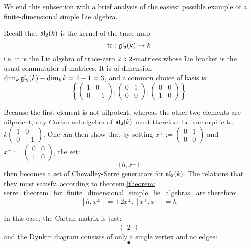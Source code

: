         We end this subsection with a brief analysis of the easiest possible example of a finite-dimensional simple Lie algebra. 
        \begin{example}[$\sl_2$] \label{example: sl_2}
            Recall that $\sl_2(k)$ is the kernel of the trace map:
                $$\trace: \gl_2(k) \to k$$
            i.e. it is the Lie algebra of trace-zero $2 \x 2$-matrices whose Lie bracket is the usual commutator of matrices. It is of dimension $\dim_k \gl_2(k) - \dim_k k = 4 - 1 = 3$, and a common choice of basis is:
                $$\left\{ \begin{pmatrix} 1 & 0 \\ 0 & -1 \end{pmatrix}, \begin{pmatrix} 0 & 1 \\ 0 & 0 \end{pmatrix}, \begin{pmatrix} 0 & 0 \\ 1 & 0 \end{pmatrix} \right\}$$
                
            Because the first element is not nilpotent, whereas the other two elements are nilpotent, any Cartan subalgebra of $\sl_2(k)$ must therefore be isomorphic to $k \begin{pmatrix} 1 & 0 \\ 0 & -1 \end{pmatrix}$. One can then show that by setting $x^+ := \begin{pmatrix} 0 & 1 \\ 0 & 0 \end{pmatrix}$ and $x^- := \begin{pmatrix} 0 & 0 \\ 1 & 0 \end{pmatrix}$, the set:
                $$\{h, x^{\pm}\}$$
            then becomes a set of Chevalley-Serre generators for $\sl_2(k)$. The relations that they must satisfy, according to theorem \ref{theorem: serre_theorem_for_finite_dimensional_simple_lie_algebras}, are therefore:
                $$[h, x^{\pm}] = \pm 2 x^{\pm}, [x^+, x^-] = h$$
            
            In this case, the Cartan matrix is just:
                $$\begin{pmatrix} 2 \end{pmatrix}$$
            and the Dynkin diagram consists of only a single vertex and no edges:
                $$\bullet$$
        \end{example}

